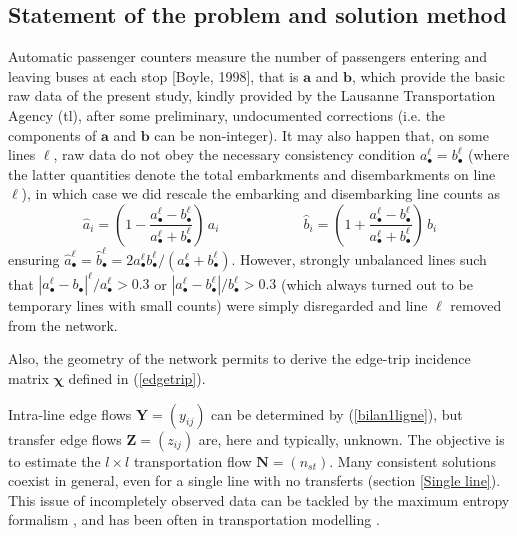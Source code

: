 \documentclass{bmcart}
\begin{document}
\subsection{Statement of the problem and solution method}
Automatic passenger counters measure the number of passengers entering and leaving buses at each stop [Boyle, 1998], that is $\mathbf{a}$ and $\mathbf{b}$, which provide the basic raw data of the present study, kindly provided by the Lausanne Transportation Agency (tl), after some preliminary, undocumented corrections (i.e. the components of $\mathbf{a}$ and $\mathbf{b}$ can be non-integer). It may also happen that, on some lines $\ell$,  raw data do not obey the necessary consistency condition  $a_\bullet^\ell=b_\bullet^\ell$ (where the latter quantities denote the total embarkments and disembarkments on line $\ell$), in which case we did rescale the embarking and disembarking line counts as 
\begin{displaymath}
\hat{a}_i=(1-\frac{a_\bullet^\ell-b_\bullet^\ell}{a_\bullet^\ell+b_\bullet^\ell})\, a_i 
 \qquad\qquad\qquad
  \hat{b}_i=(1+\frac{a_\bullet^\ell-b_\bullet^\ell}{a_\bullet^\ell+b_\bullet^\ell})\,  b_i 
\end{displaymath}
ensuring $\hat{a}_\bullet^\ell=\hat{b}_\bullet^\ell=2a_\bullet^\ell b_\bullet^\ell/(a_\bullet^\ell+b_\bullet^\ell)$. However, strongly unbalanced lines such that  $|a_\bullet^\ell-b_\bullet|^\ell/a_\bullet^\ell > 0.3$ or $|a_\bullet^\ell-b_\bullet^\ell|/b_\bullet^\ell > 0.3$  (which always turned out to be temporary lines with small  counts) were simply disregarded and line $\ell$ removed from the network. 

Also, the geometry of the network permits to derive the edge-trip incidence matrix $\bm{\chi}$ defined in (\ref{edgetrip}). 


Intra-line edge flows $\mathbf{Y}=(y_{ij})$ can be determined by (\ref{bilan1ligne}), but transfer edge flows $\mathbf{Z}=(z_{ij})$ are, here and typically, unknown. The objective is to estimate the $l\times l$ transportation flow $\mathbf{N}=(n_{st})$. Many consistent solutions coexist in general, even for a single line with no transferts (section \ref{Single line}). This issue of incompletely observed data can be tackled by the maximum entropy formalism \cite{jaynes1957information}, and has been often  in transportation modelling \cite{wilson1967statistical}  \cite{erlander1990gravity}. 
\end{document}
